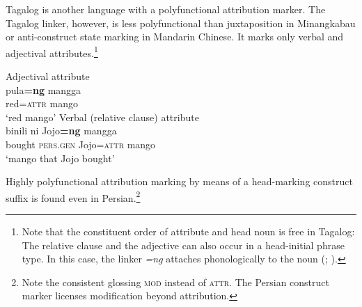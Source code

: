 Tagalog is another language with a polyfunctional attribution marker. The Tagalog linker, however, is less polyfunctional than juxtaposition in Minangkabau or anti-construct state marking in Mandarin Chinese. It marks only verbal and adjectival attributes.\footnote{Note that the constituent order of attribute and head noun is free in Tagalog: The relative clause and the adjective can also occur in a head-initial phrase type. In this case, the linker \textit{=ng} attaches phonologically to the noun (\citealt[1]{gil2005}; \citealt[160, 162]{himmelmann1997}).}
\begin{exe}
\ex 
{} \label{multi tagalog}
\begin{xlist}
\ex \rm{Adjectival attribute}\\
\gll	pula\textbf{=ng} mangga\\
	red{=\textsc{attr}} mango\\
\glt	‘red mango’
\ex \rm{Verbal (relative clause) attribute}\\
\gll	binili ni Jojo\textbf{=ng} mangga\\
	bought \textsc{pers.gen} Jojo{=\textsc{attr}} mango\\
\glt	‘mango that Jojo bought’
\end{xlist}
\end{exe}
Highly polyfunctional attribution marking by means of a head-marking construct suffix is found even in Persian.\footnote{Note the consistent glossing \textsc{mod} instead of \textsc{attr}. The Persian construct marker licenses modification beyond attribution.}
